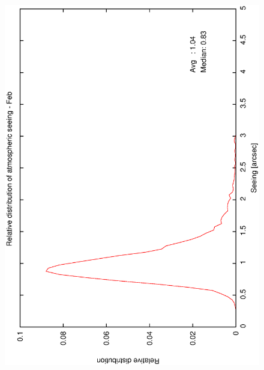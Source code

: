 {{\begin{figure}[htbp]
\begin{center}
{   \includegraphics[scale=0.25, angle=-90]{figures/ecs/corr_see_dist_feb.eps}  
   \label{fig:see_dist_feb}
  }
 \subfigure[] {
}
\end{center}
\end{figure}}}
